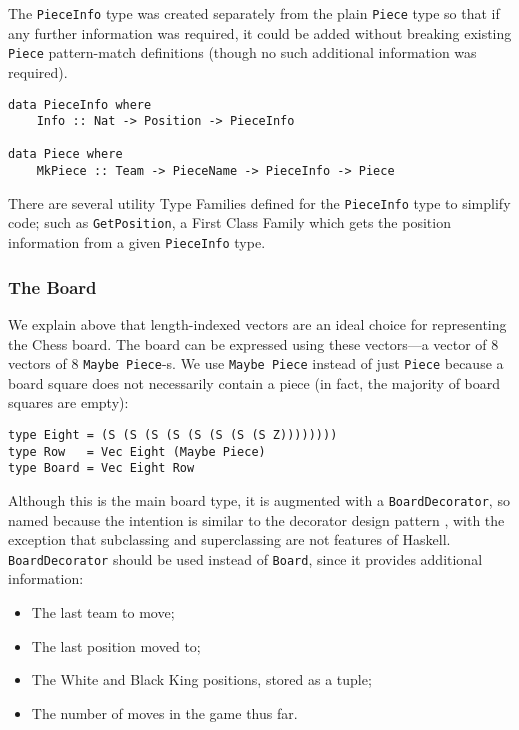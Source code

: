 \documentclass[12pt, a4paper, bibliography=totocnumbered]{scrreprt}
\newcommand{\inline}[1]{\lstinline[basicstyle=\ttfamily\footnotesize]{#1}}
\begin{document}
The \inline{PieceInfo} type was created separately from the plain \inline{Piece} type so that if any further information was required, it could be added without breaking existing \inline{Piece} pattern-match definitions (though no such additional information was required).

\begin{lstlisting}
data PieceInfo where
    Info :: Nat -> Position -> PieceInfo

data Piece where
    MkPiece :: Team -> PieceName -> PieceInfo -> Piece
\end{lstlisting}

There are several utility Type Families defined for the \inline{PieceInfo} type to simplify code; such as \inline{GetPosition}, a First Class Family which gets the position information from a given \inline{PieceInfo} type.

\subsubsection{The Board}

We explain above that length-indexed vectors are an ideal choice for representing the Chess board. The board can be expressed using these vectors---a vector of 8 vectors of 8 \inline{Maybe Piece}-s. We use \inline{Maybe Piece} instead of just \inline{Piece} because a board square does not necessarily contain a piece (in fact, the majority of board squares are empty):

\begin{lstlisting}
type Eight = (S (S (S (S (S (S (S (S Z))))))))
type Row   = Vec Eight (Maybe Piece)
type Board = Vec Eight Row
\end{lstlisting}

Although this is the main board type, it is augmented with a \inline{BoardDecorator}, so named because the intention is similar to the decorator design pattern \cite{decorator}, with the exception that subclassing and superclassing are not features of Haskell. \inline{BoardDecorator} should be used instead of \inline{Board}, since it provides additional information:

\begin{itemize}
    \item The last team to move;
    \item The last position moved to;
    \item The White and Black King positions, stored as a tuple;
    \item The number of moves in the game thus far.
\end{itemize}
\end{document}
